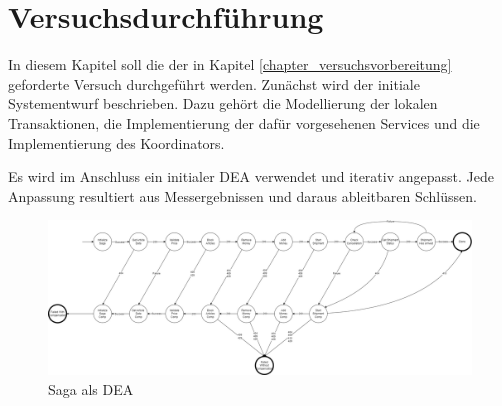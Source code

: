\chapter{Versuchsdurchführung} \label{chapter_basic_saga}

In diesem Kapitel soll die der in Kapitel \ref{chapter_versuchsvorbereitung} geforderte Versuch durchgeführt werden. Zunächst wird der initiale Systementwurf beschrieben. Dazu gehört die Modellierung der lokalen Transaktionen, die Implementierung der dafür vorgesehenen Services und die Implementierung des Koordinators.

Es wird im Anschluss ein initialer DEA verwendet und iterativ angepasst. Jede Anpassung resultiert aus Messergebnissen und daraus ableitbaren Schlüssen.

















\begin{figure}[h!]
	\centering
	\includegraphics[width=\linewidth]{figures/DatabaseER/DEA_No_NetworkErrors_No_Retries.png}
	\caption{Saga als DEA}
\end{figure}
\FloatBarrier